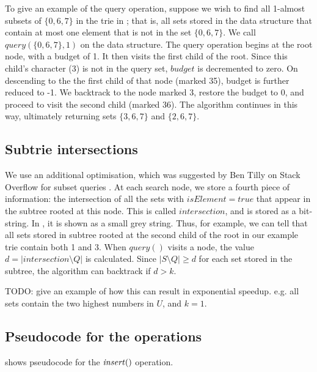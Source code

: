 To give an example of the query operation, suppose we wish to find all
1-almost subsets of $\{0,6,7\}$ in the trie in ; that is,
all sets stored in the data structure that contain at most one element that 
is not in the set $\{0,6,7\}$.  We call $\mathit{query}(\{0,6,7\}, 1)$ on
the data structure.  The query operation begins at the root node, with a budget
of 1.  It then visits the first child of the root.  Since this child's character
(3) is not in the query set, $\mathit{budget}$ is decremented to zero.
On descending to the the first child of that node (marked 35), budget is
further reduced to -1.  We backtrack to the node marked 3, restore the budget
to 0, and proceed to visit the second child (marked 36).  The algorithm
continues in this way, ultimately returning sets $\{3,6,7\}$ and $\{2,6,7\}$.

\subsection{Subtrie intersections}\label{sec:subtrieintersections}

We use an additional optimisation, which was suggested by Ben Tilly on Stack
Overflow for subset queries \cite{TrieStackOverflow}.  At each search node, we
store a fourth piece of information: the intersection of all the sets with
$\mathit{isElement}=\mathit{true}$ that appear in the subtree rooted at this
node.  This is called $\mathit{intersection}$, and is stored as a bit-string.
In , it is shown as a small grey string.
Thus, for example, we can tell that all sets stored in subtree rooted at the
second child of the root in our example trie contain both 1 and 3.
When $\mathit{query}()$ visits a node, the value $d = |\mathit{intersection} \setminus Q|$ is
calculated.  Since $|S \setminus Q| \geq d$ for
each set stored in the subtree, the algorithm can backtrack if $d > k$.

TODO: give an example of how this can result in exponential speedup.  e.g. all sets
contain the two highest numbers in $U$, and $k=1$.

\subsection{Pseudocode for the operations}\label{sec:pseudocode}

 shows pseudocode for the $\mathit{insert}()$ operation.

